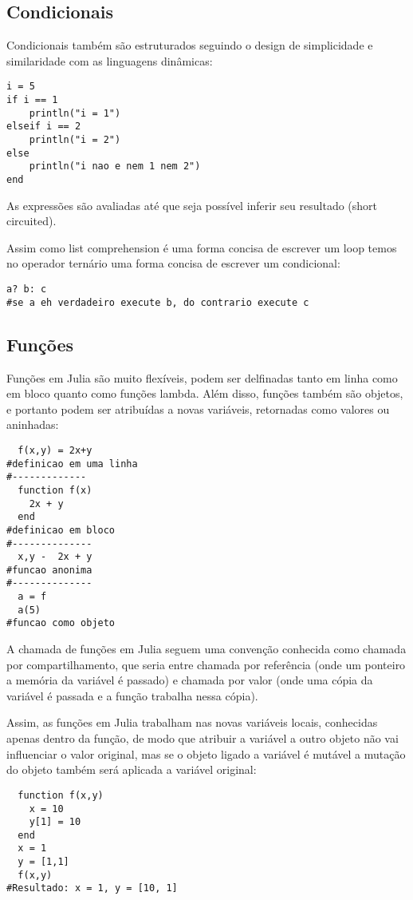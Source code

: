 \subsection{Condicionais}
Condicionais também são estruturados seguindo o design de simplicidade e similaridade com as linguagens dinâmicas:
\begin{lstlisting}
i = 5
if i == 1 
	println("i = 1")
elseif i == 2
	println("i = 2")
else 
	println("i nao e nem 1 nem 2")
end
\end{lstlisting}

As expressões são avaliadas até que seja possível inferir seu resultado (short circuited).%

Assim como list comprehension é uma forma concisa de escrever um loop temos no operador ternário uma forma concisa de escrever um condicional:
\begin{lstlisting}
a? b: c
#se a eh verdadeiro execute b, do contrario execute c
\end{lstlisting}

\subsection{Funções}
Funções em Julia são muito flexíveis, podem ser delfinadas tanto em linha como em bloco quanto como funções lambda. Além disso, funções também são objetos, e portanto podem ser atribuídas a novas variáveis, retornadas como valores ou aninhadas:
\begin{lstlisting}
  f(x,y) = 2x+y
#definicao em uma linha
#-------------
  function f(x) 
  	2x + y 
  end
#definicao em bloco
#--------------
  x,y -  2x + y
#funcao anonima
#--------------
  a = f
  a(5)
#funcao como objeto
\end{lstlisting}

A chamada de funções em Julia seguem uma convenção conhecida como chamada por compartilhamento, que seria entre chamada por referência (onde um ponteiro a memória da variável é passado) e chamada por valor (onde uma cópia da variável é passada e a função trabalha nessa cópia).

Assim, as funções em Julia trabalham nas novas variáveis locais, conhecidas apenas dentro da função, de modo que atribuir a variável a outro objeto não vai influenciar o valor original, mas se o objeto ligado a variável é mutável a mutação do objeto também será aplicada a variável original:
\begin{lstlisting}
  function f(x,y) 
  	x = 10
  	y[1] = 10
  end
  x = 1
  y = [1,1]
  f(x,y)
#Resultado: x = 1, y = [10, 1]

\end{lstlisting}

